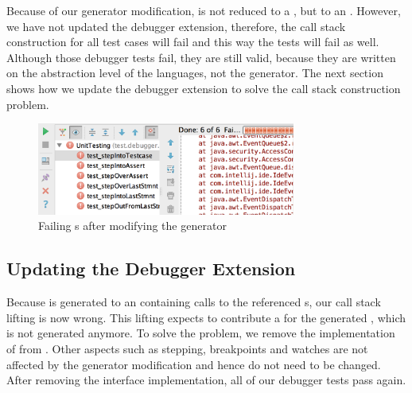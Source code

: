 Because of our generator modification,  is not
reduced to a , but to an . However, we have not
updated the debugger extension, therefore, the call stack construction for all test cases
will fail and this way the tests will fail as well. Although those debugger
tests fail, they are still valid, because they are written on the abstraction level of
the languages, not the generator. The next section shows how we update the
debugger extension to solve the call stack construction problem.

\begin{figure}[h]
	\vspace{-2mm}
	\centering
    \includegraphics[width=8.5cm]{./figures/failingDebuggerTests.png} 
    \vspace{-3mm}
	\caption{Failing s after modifying the generator}
	\label{fig:TestExecution2}
	\vspace{-2mm}
\end{figure}

\subsection{Updating the Debugger Extension}

Because  is generated to an  containing
calls to the referenced s, our call stack lifting is now wrong.
This lifting expects to contribute a  for the generated
, which is not generated anymore.
To solve the problem, we remove the implementation of  from
. Other aspects such as stepping, breakpoints
and watches are not affected by the generator modification and hence do not need
to be changed. After removing the interface implementation, all of our debugger
tests pass again.